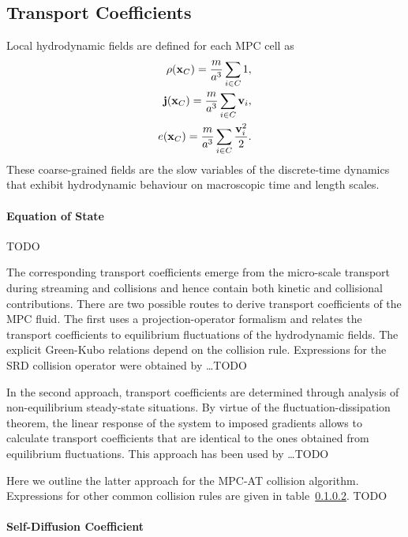\documentclass[8.5pt,twoside,twocolumn]{article}
\renewcommand{\vec}[1]{{\ensuremath{\mathchoice
                     {\mbox{\boldmath$\displaystyle\mathbf{#1}$}}
                     {\mbox{\boldmath$\textstyle\mathbf{#1}$}}
                     {\mbox{\boldmath$\scriptstyle\mathbf{#1}$}}
                     {\mbox{\boldmath$\scriptscriptstyle\mathbf{#1}$}}}}}%
\newcommand{\jvec}{\ensuremath{\vec{j}}}
\newcommand{\vvec}{\ensuremath{\vec{v}}}
\newcommand{\xvec}{\ensuremath{\vec{x}}}
\begin{document}
\subsection{Transport Coefficients}

Local hydrodynamic fields are defined for each MPC cell as
%
\begin{align}
\rho(\xvec_C) = \frac{m}{a^3} \sum_{i\in C} 1 , \\
\jvec(\xvec_C) = \frac{m}{a^3} \sum_{i \in C} \vvec_i , \\
e(\xvec_C) = \frac{m}{a^3} \sum_{i \in C} \frac{\vvec_i^2}{2} .
\end{align}
%
These coarse-grained fields are the slow variables of the discrete-time dynamics that exhibit hydrodynamic behaviour on macroscopic time and length scales.

\paragraph{Equation of State} TODO

The corresponding transport coefficients emerge from the micro-scale transport during streaming and collisions and hence contain both kinetic and collisional contributions. There are two possible routes to derive transport coefficients of the MPC fluid. The first uses a projection-operator formalism and relates the transport coefficients to equilibrium fluctuations of the hydrodynamic fields. The explicit Green-Kubo relations depend on the collision rule. Expressions for the SRD collision operator were obtained by \dots TODO

In the second approach, transport coefficients are determined through analysis of non-equilibrium steady-state situations. By virtue of the fluctuation-dissipation theorem, the linear response of the system to imposed gradients allows to calculate transport coefficients that are identical to the ones obtained from equilibrium fluctuations. This approach has been used by \dots TODO

Here we outline the latter approach for the MPC-AT collision algorithm. Expressions for other common collision rules are given in table~\ref{}. TODO

\paragraph{Self-Diffusion Coefficient}
\end{document}
